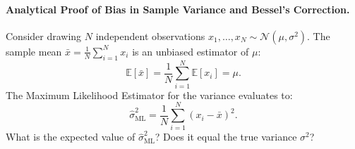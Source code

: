 \paragraph{Analytical Proof of Bias in Sample Variance and Bessel's Correction.}
Consider drawing $N$ independent observations $x_1, \dots, x_N \sim \mathcal{N}(\mu, \sigma^2)$. The sample mean $\bar{x} = \frac{1}{N}\sum_{i=1}^N x_i$ is an unbiased estimator of $\mu$:
\begin{equation}
\mathbb{E}[\bar{x}] = \frac{1}{N}\sum_{i=1}^N \mathbb{E}[x_i] = \mu.
\end{equation}
The Maximum Likelihood Estimator for the variance evaluates to:
\begin{equation}
\hat{\sigma}^2_{\text{ML}} = \frac{1}{N} \sum_{i=1}^N (x_i - \bar{x})^2.
\label{eq:mle_sample_variance}
\end{equation}
What is the expected value of $\hat{\sigma}^2_{\text{ML}}$? Does it equal the true variance $\sigma^2$?

